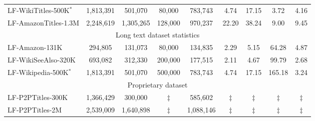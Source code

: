 \begin{table*}
{\begin{tabular}{l|cccccccc}
            LF-WikiTitles-500K$^\ast$ & 1,813,391 & 501,070 & 80,000 & 783,743 & 4.74 & 17.15 & 3.72 & 4.16 \\
            LF-AmazonTitles-1.3M & 2,248,619 & 1,305,265 & 128,000 & 970,237 & 22.20 & 38.24 & 9.00 & 9.45 \\\midrule
            \multicolumn{9}{c}{Long text dataset statistics}\\
            \midrule
            LF-Amazon-131K & 294,805 & 131,073 & 80,000 & 134,835 & 2.29 & 5.15 & 64.28 & 4.87 \\
            LF-WikiSeeAlso-320K & 693,082 & 312,330 & 200,000 & 177,515 & 2.11 & 4.67 & 99.79 & 2.68 \\
            LF-Wikipedia-500K$^\ast$ & 1,813,391 & 501,070 & 500,000 & 783,743 & 4.74 & 17.15 & 165.18 & 3.24 \\
            \midrule
            \multicolumn{9}{c}{Proprietary dataset}\\
            \midrule
            LF-P2PTitles-300K & 1,366,429 & 300,000 & $\ddagger$ & 585,602 & $\ddagger$ & $\ddagger$ & $\ddagger$ & $\ddagger$ \\
            
            LF-P2PTitles-2M & 2,539,009 & 1,640,898 & $\ddagger$ & 1,088,146 & $\ddagger$ & $\ddagger$ & $\ddagger$ & $\ddagger$ \\
            \bottomrule
    	\end{tabular}
	}
\end{table*}
